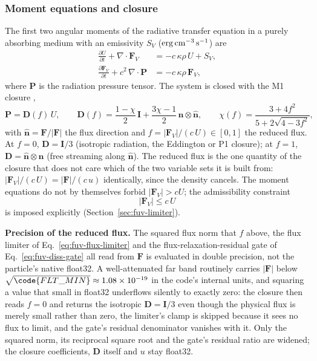 \subsubsection{Moment equations and closure}
\label{sec:fuv-moments}

The first two angular moments of the radiative transfer equation in a
purely absorbing medium with an emissivity $S_V$ (${\rm
erg\,cm^{-3}\,s^{-1}}$) are
\begin{align}
  \frac{\partial U}{\partial t} + \nabla\cdot\mathbf F_V
    &= -c\,\kappa\rho\,U + S_V ,
  \label{eq:fuv-moment-zero} \\
  \frac{\partial \mathbf F_V}{\partial t} + c^2\,\nabla\cdot\mathbf P
    &= -c\,\kappa\rho\,\mathbf F_V ,
  \label{eq:fuv-moment-one}
\end{align}
where $\mathbf P$ is the radiation pressure tensor. The system is closed
with the M1 closure \citep{Levermore1984,DubrocaFeugeas1999},
\begin{equation}
  \mathbf P = \mathbf D(f)\,U , \qquad
  \mathbf D(f) = \frac{1-\chi}{2}\,\mathbf I + \frac{3\chi-1}{2}\,
    \hat{\mathbf n}\otimes\hat{\mathbf n} , \qquad
  \chi(f) = \frac{3+4f^2}{5+2\sqrt{4-3f^2}} ,
  \label{eq:fuv-m1-closure}
\end{equation}
with $\hat{\mathbf n} = \mathbf F/|\mathbf F|$ the flux direction and $f
= |\mathbf F_V|/(c\,U)\in[0,1]$ the reduced flux. At $f = 0$, $\mathbf D
= \mathbf I/3$ (isotropic radiation, the Eddington or P1 closure); at $f
= 1$, $\mathbf D = \hat{\mathbf n}\otimes\hat{\mathbf n}$ (free streaming
along $\hat{\mathbf n}$). The reduced flux is the one quantity of the
closure that does not care which of the two variable sets it is built from:
$|\mathbf F_V|/(c\,U) = |\mathbf F|/(c\,u)$ identically, since the density
cancels. The moment equations do not by themselves
forbid $|\mathbf F_V| > cU$; the admissibility constraint
\begin{equation}
  |\mathbf F_V| \le c\,U
  \label{eq:fuv-admissible}
\end{equation}
is imposed explicitly (Section~\ref{sec:fuv-limiter}).

\textbf{Precision of the reduced flux.} The squared flux norm that $f$
above, the flux limiter of Eq.~\ref{eq:fuv-flux-limiter} and the
flux-relaxation-residual gate of Eq.~\ref{eq:fuv-diss-gate} all read
from $\mathbf F$ is evaluated in double precision, not the particle's
native float32. A well-attenuated far band routinely carries
$|\mathbf F|$ below $\sqrt{\code{FLT\_MIN}}\approx1.08\times10^{-19}$ in
the code's internal units, and squaring a value that small in float32
underflows silently to exactly zero: the closure then reads $f=0$ and
returns the isotropic $\mathbf D=\mathbf I/3$ even though the physical
flux is merely small rather than zero, the limiter's clamp is skipped
because it sees no flux to limit, and the gate's residual denominator
vanishes with it. Only the squared norm, its reciprocal square root and
the gate's residual ratio are widened; the closure coefficients,
$\mathbf D$ itself and $u$ stay float32.

